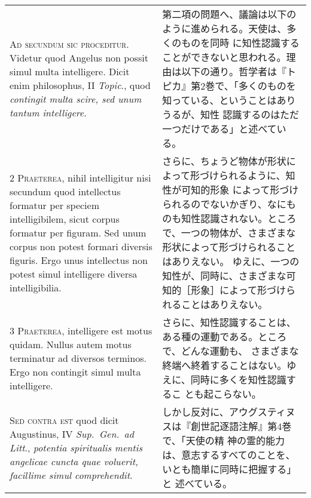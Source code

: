 \documentclass[10pt]{jsarticle} %
\begin{document}
\begin{longtable}{p{21em}p{21em}}

{\Huge A}{\scshape d secundum sic proceditur}. Videtur quod
Angelus non possit simul multa intelligere. Dicit enim philosophus, II
{\itshape Topic}., quod {\itshape contingit multa scire, sed unum tantum intelligere}.


&


第二項の問題へ、議論は以下のように進められる。天使は、多くのものを同時
に知性認識することができないと思われる。理由は以下の通り。哲学者は『ト
ピカ』第2巻で、「多くのものを知っている、ということはありうるが、知性
認識するのはただ一つだけである」と述べている。

\\


{\scshape 2 Praeterea}, nihil intelligitur nisi secundum
quod intellectus formatur per speciem intelligibilem, sicut corpus
formatur per figuram. Sed unum corpus non potest formari diversis
figuris. Ergo unus intellectus non potest simul intelligere diversa
intelligibilia.


&

さらに、ちょうど物体が形状によって形づけられるように、知性が可知的形象
によって形づけられるのでないかぎり、なにものも知性認識されない。ところ
で、一つの物体が、さまざまな形状によって形づけられることはありえない。
ゆえに、一つの知性が、同時に、さまざまな可知的［形象］によって形づけら
れることはありえない。


\\


{\scshape 3 Praeterea}, intelligere est motus
quidam. Nullus autem motus terminatur ad diversos terminos. Ergo non
contingit simul multa intelligere.


&


さらに、知性認識することは、ある種の運動である。ところで、どんな運動も、
さまざまな終端へ終着することはない。ゆえに、同時に多くを知性認識するこ
とも起こらない。

\\


{\scshape Sed contra est} quod dicit Augustinus, IV
{\itshape Sup.~Gen.~ad Litt}., {\itshape potentia spiritualis mentis angelicae cuncta quae
voluerit, facillime simul comprehendit}.


&


しかし反対に、アウグスティヌスは『創世記逐語注解』第4巻で、「天使の精
神の霊的能力は、意志するすべてのことを、いとも簡単に同時に把握する」と
述べている。

\\



\end{longtable}
\end{document}
